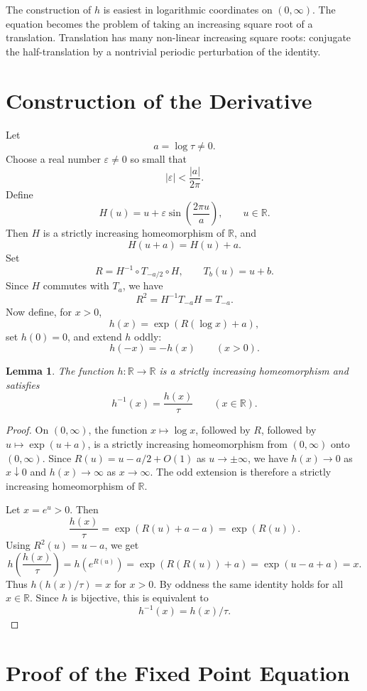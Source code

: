 \documentclass[11pt]{article}
\newtheorem{lemma}{Lemma}
\begin{document}
The construction of \(h\) is easiest in logarithmic coordinates on
\((0,\infty)\). The equation becomes the problem of taking an increasing square
root of a translation. Translation has many non-linear increasing square roots:
conjugate the half-translation by a nontrivial periodic perturbation of the
identity.

\section*{Construction of the Derivative}

Let
\[
a=\log\tau \neq 0.
\]
Choose a real number \(\varepsilon\neq0\) so small that
\[
|\varepsilon|<\frac{|a|}{2\pi}.
\]
Define
\[
H(u)=u+\varepsilon\sin\left(\frac{2\pi u}{a}\right),\qquad u\in\mathbb R.
\]
Then \(H\) is a strictly increasing homeomorphism of \(\mathbb R\), and
\[
H(u+a)=H(u)+a.
\]
Set
\[
R=H^{-1}\circ T_{-a/2}\circ H,
\qquad T_b(u)=u+b.
\]
Since \(H\) commutes with \(T_a\), we have
\[
R^2=H^{-1}T_{-a}H=T_{-a}.
\]
Now define, for \(x>0\),
\[
h(x)=\exp(R(\log x)+a),
\]
set \(h(0)=0\), and extend \(h\) oddly:
\[
h(-x)=-h(x)\qquad (x>0).
\]

\begin{lemma}
The function \(h:\mathbb R\to\mathbb R\) is a strictly increasing homeomorphism
and satisfies
\[
h^{-1}(x)=\frac{h(x)}{\tau}\qquad(x\in\mathbb R).
\]
\end{lemma}

\begin{proof}
On \((0,\infty)\), the function \(x\mapsto \log x\), followed by \(R\), followed
by \(u\mapsto \exp(u+a)\), is a strictly increasing homeomorphism from
\((0,\infty)\) onto \((0,\infty)\). Since \(R(u)=u-a/2+O(1)\) as
\(u\to\pm\infty\), we have \(h(x)\to0\) as \(x\downarrow0\) and
\(h(x)\to\infty\) as \(x\to\infty\). The odd extension is therefore a strictly
increasing homeomorphism of \(\mathbb R\).

Let \(x=e^u>0\). Then
\[
\frac{h(x)}{\tau}
=\exp(R(u)+a-a)
=\exp(R(u)).
\]
Using \(R^2(u)=u-a\), we get
\[
h\left(\frac{h(x)}{\tau}\right)
=h(e^{R(u)})
=\exp(R(R(u))+a)
=\exp(u-a+a)
=x.
\]
Thus \(h(h(x)/\tau)=x\) for \(x>0\). By oddness the same identity holds for
all \(x\in\mathbb R\). Since \(h\) is bijective, this is equivalent to
\[
h^{-1}(x)=h(x)/\tau .
\]
\end{proof}

\section*{Proof of the Fixed Point Equation}
\end{document}
